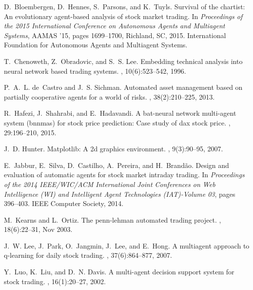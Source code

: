 \documentclass{aamas2017-extabs}
\begin{document}
\begin{thebibliography}{10}

D.~Bloembergen, D.~Hennes, S.~Parsons, and K.~Tuyls.
\newblock Survival of the chartist: An evolutionary agent-based analysis of
  stock market trading.
\newblock In {\em Proceedings of the 2015 International Conference on
  Autonomous Agents and Multiagent Systems}, AAMAS '15, pages 1699--1700,
  Richland, SC, 2015. International Foundation for Autonomous Agents and
  Multiagent Systems.

T.~Chenoweth, Z.~Obradovic, and S.~S. Lee.
\newblock Embedding technical analysis into neural network based trading
  systems.
, 10(6):523--542, 1996.

P.~A.~L. de~Castro and J.~S. Sichman.
\newblock Automated asset management based on partially cooperative agents for
  a world of risks.
, 38(2):210--225, 2013.

R.~Hafezi, J.~Shahrabi, and E.~Hadavandi.
\newblock A bat-neural network multi-agent system (bnnmas) for stock price
  prediction: Case study of dax stock price.
, 29:196--210, 2015.

J.~D. Hunter.
\newblock Matplotlib: A 2d graphics environment.
, 9(3):90--95, 2007.

E.~Jabbur, E.~Silva, D.~Castilho, A.~Pereira, and H.~Brand{\~a}o.
\newblock Design and evaluation of automatic agents for stock market intraday
  trading.
\newblock In {\em Proceedings of the 2014 IEEE/WIC/ACM International Joint
  Conferences on Web Intelligence (WI) and Intelligent Agent Technologies
  (IAT)-Volume 03}, pages 396--403. IEEE Computer Society, 2014.

M.~Kearns and L.~Ortiz.
\newblock The penn-lehman automated trading project.
, 18(6):22--31, Nov 2003.

\vfill\eject

J.~W. Lee, J.~Park, O.~Jangmin, J.~Lee, and E.~Hong.
\newblock A multiagent approach to q-learning for daily stock trading.
, 37(6):864--877, 2007.

Y.~Luo, K.~Liu, and D.~N. Davis.
\newblock A multi-agent decision support system for stock trading.
, 16(1):20--27, 2002.


\end{thebibliography}
\end{document}
